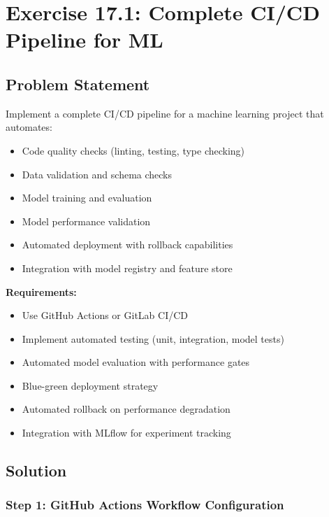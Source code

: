 \section{Exercise 17.1: Complete CI/CD Pipeline for ML}
\label{sol:ex17_1}

\subsection*{Problem Statement}

Implement a complete CI/CD pipeline for a machine learning project that automates:
\begin{itemize}
    \item Code quality checks (linting, testing, type checking)
    \item Data validation and schema checks
    \item Model training and evaluation
    \item Model performance validation
    \item Automated deployment with rollback capabilities
    \item Integration with model registry and feature store
\end{itemize}

\textbf{Requirements:}
\begin{itemize}
    \item Use GitHub Actions or GitLab CI/CD
    \item Implement automated testing (unit, integration, model tests)
    \item Automated model evaluation with performance gates
    \item Blue-green deployment strategy
    \item Automated rollback on performance degradation
    \item Integration with MLflow for experiment tracking
\end{itemize}

\subsection*{Solution}

\subsubsection*{Step 1: GitHub Actions Workflow Configuration}

